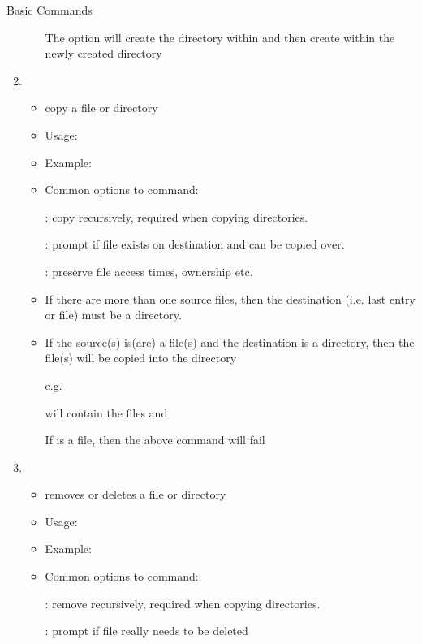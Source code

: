 \documentclass[10pt,t]{beamer}
\begin{document}
\begin{frame}{Basic Commands}
\begin{enumerate}
\begin{itemize}
    \item[] The  option will create the  directory within  and then create  within the newly created  directory
    \end{itemize}
    \framebreak
  \item {}
    \begin{itemize}
    \item copy a file or directory
    \item Usage: 
    \item Example: 
    \item Common options to  command:
    \item[] : copy recursively, required when copying directories.
    \item[] : prompt if file exists on destination and can be copied over.
    \item[] : preserve file access times, ownership etc.
    \item If there are more than one source files, then the destination (i.e. last entry or file) must be a directory.
    \item If the source(s) is(are) a file(s) and the destination is a directory, then the file(s) will be copied into the directory
    \item[e.g.]
    \item[]  will contain the files  and 
    \item[] If  is a file, then the above command will fail
    \end{itemize}
    \framebreak
  \item {} 
    \begin{itemize}
    \item removes or deletes a file or directory
    \item Usage: 
    \item Example: 
    \item Common options to  command:
    \item[] : remove recursively, required when copying directories.
    \item[] : prompt if file really needs to be deleted

\end{itemize}
\end{enumerate}
\end{frame}
\end{document}
